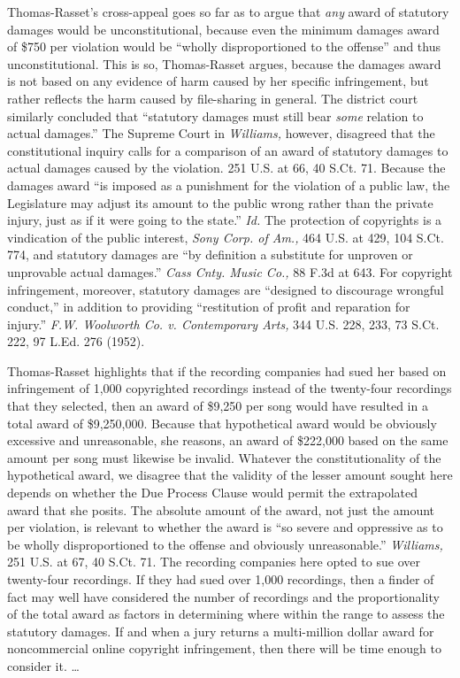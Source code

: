 Thomas-Rasset's cross-appeal goes so far as to argue that \textit{any} award of
statutory damages would be unconstitutional, because even the minimum damages
award of \$750 per violation would be ``wholly disproportioned to the offense''
and thus unconstitutional. This is so, Thomas-Rasset argues, because the
damages award is not based on any evidence of harm caused by her specific
infringement, but rather reflects the harm caused by file-sharing in general.
The district court similarly concluded that ``statutory damages must still bear
\textit{some} relation to actual damages.'' The Supreme Court in
\textit{Williams,} however, disagreed that the constitutional inquiry calls for
a comparison of an award of statutory damages to actual damages caused by the
violation. 251 U.S. at 66, 40 S.Ct. 71. Because the damages award ``is imposed
as a punishment for the violation of a public law, the Legislature may adjust
its amount to the public wrong rather than the private injury, just as if it
were going to the state.'' \textit{Id.} The protection of copyrights is a
vindication of the public interest, \textit{Sony Corp. of Am.,} 464 U.S. at
429, 104 S.Ct. 774, and statutory damages are ``by definition a substitute for
unproven or unprovable actual damages.'' \textit{Cass Cnty. Music Co.,} 88 F.3d
at 643. For copyright infringement, moreover, statutory damages are ``designed
to discourage wrongful conduct,'' in addition to providing ``restitution of
profit and reparation for injury.'' \textit{F.W. Woolworth Co. v. Contemporary
Arts,} 344 U.S. 228, 233, 73 S.Ct. 222, 97 L.Ed. 276 (1952).

Thomas-Rasset highlights that if the recording companies had sued her based on
infringement of 1,000 copyrighted recordings instead of the twenty-four
recordings that they selected, then an award of \$9,250 per song would have
resulted in a total award of \$9,250,000. Because that hypothetical award would
be obviously excessive and unreasonable, she reasons, an award of \$222,000
based on the same amount per song must likewise be invalid. Whatever the
constitutionality of the hypothetical award, we disagree that the validity of
the lesser amount sought here depends on whether the Due Process Clause would
permit the extrapolated award that she posits. The absolute amount of the
award, not just the amount per violation, is relevant to whether the award is
``so severe and oppressive as to be wholly disproportioned to the offense and
obviously unreasonable.'' \textit{Williams,} 251 U.S. at 67, 40 S.Ct. 71. The
recording companies here opted to sue over twenty-four recordings. If they had
sued over 1,000 recordings, then a finder of fact may well have considered the
number of recordings and the proportionality of the total award as factors in
determining where within the range to assess the statutory damages. If and when
a jury returns a multi-million dollar award for noncommercial online copyright
infringement, then there will be time enough to consider it. {\dots}

